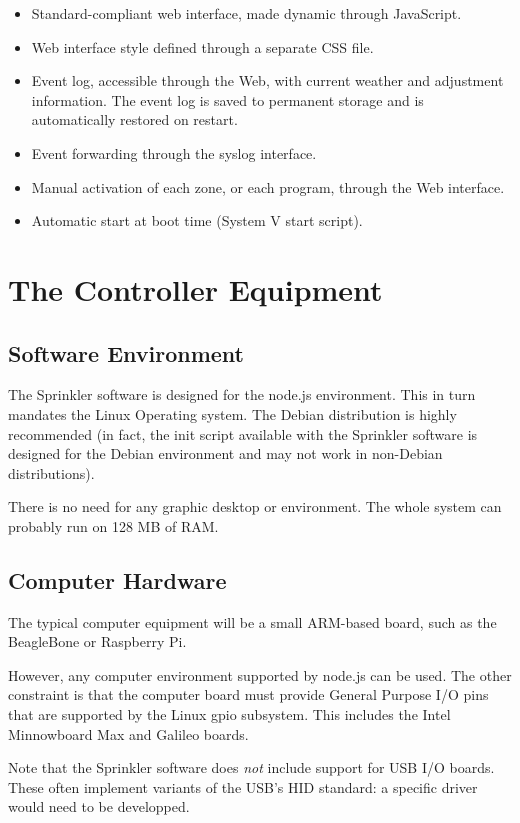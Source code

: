 \documentclass[11pt]{book}
\begin{document}
\begin{itemize}
\item Standard-compliant web interface, made dynamic through JavaScript.
\item Web interface style defined through a separate CSS file.
\item Event log, accessible through the Web, with current weather and adjustment information. The event log is saved to permanent storage and is automatically restored on restart.
\item Event forwarding through the syslog interface.
\item Manual activation of each zone, or each program, through the Web interface.
\item Automatic start at boot time (System V start script).
\end{itemize}
\chapter{The Controller Equipment}
\section{Software Environment}
The Sprinkler software is designed for the node.js environment. This in turn mandates the Linux Operating system. The Debian distribution is highly recommended (in fact, the init script available with the Sprinkler software is designed for the Debian environment and may not work in non-Debian distributions).

There is no need for any graphic desktop or environment. The whole system can probably run on 128 MB of RAM.
\section{Computer Hardware}
The typical computer equipment will be a small ARM-based board, such as the BeagleBone or Raspberry Pi.

However, any computer environment supported by node.js can be used. The other constraint is that the computer board must provide General Purpose I/O pins that are supported by the Linux gpio subsystem. This includes the Intel Minnowboard Max and Galileo boards.

Note that the Sprinkler software does \emph{not} include support for USB I/O boards. These often implement variants of the USB's HID standard: a specific driver would need to be developped.
\end{document}
